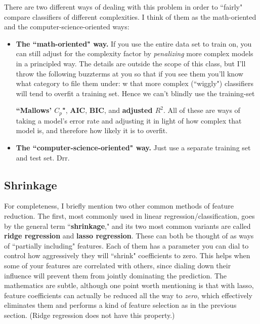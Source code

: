 \documentclass[12pt]{article}
\begin{document}
There are two different ways of dealing with this problem in order to
``fairly" compare classifiers of different complexities. I think of them as
the math-oriented and the computer-science-oriented ways:

\begin{itemize}
\itemsep.1em

\item \textbf{The ``math-oriented" way.} If you use the entire data set to
train on, you can still adjust for the complexity factor by
\textit{penalizing} more complex models in a principled way. The details are
outside the scope of this class, but I'll throw the following buzzterms at you
so that if you see them you'll know what category to file them under:
w that more complex (``wiggly")
classifiers will tend to overfit a training set. Hence we can't blindly use
the training-set 

\textbf{``Mallows' $C_p$"}, \textbf{AIC}, \textbf{BIC}, and \textbf{adjusted
$R^2$}. All of these are ways of taking a model's error rate and adjusting it
in light of how complex that model is, and therefore how likely it is to
overfit.

\item \textbf{The ``computer-science-oriented" way.} Just use a separate
training set and test set. Drr.

\end{itemize}

\small
\subsection{Shrinkage}

For completeness, I briefly mention two other common methods of feature
reduction. The first, most commonly used in linear regression/classification,
goes by the general term ``\textbf{shrinkage}," and its two most common
variants are called \textbf{ridge regression} and \textbf{lasso regression}.
These can both be thought of as ways of ``partially including" features. Each
of them has a parameter you can dial to control how aggressively they will
``shrink" coefficients to zero. This helps when some of your features are
correlated with others, since dialing down their influence will prevent them
from jointly dominating the prediction. The mathematics are subtle, although
one point worth mentioning is that with lasso, feature coefficients can
actually be reduced all the way to \textit{zero}, which effectively eliminates
them and performs a kind of feature selection as in the previous section.
(Ridge regression does not have this property.)
\end{document}
